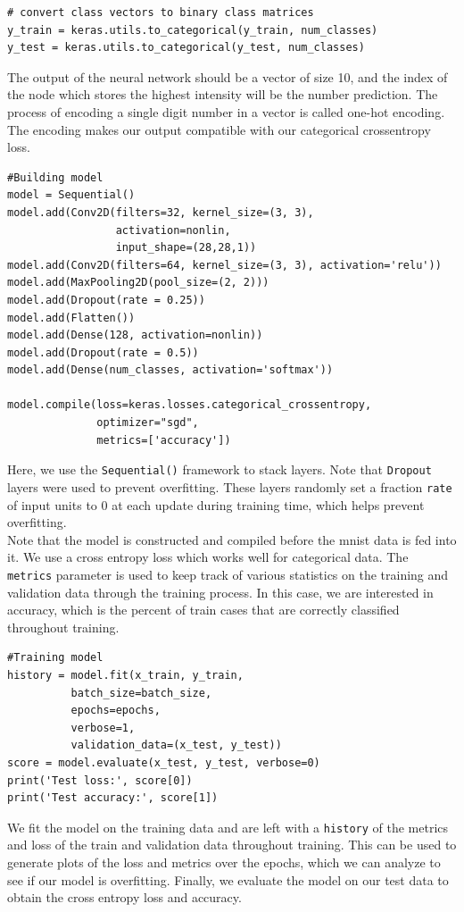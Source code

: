 \documentclass[11pt]{article}
\begin{document}
 \begin{lstlisting}
# convert class vectors to binary class matrices
y_train = keras.utils.to_categorical(y_train, num_classes)
y_test = keras.utils.to_categorical(y_test, num_classes)
\end{lstlisting}
The output of the neural network should be a vector of size 10, and the index of the node which stores the highest intensity will be the number prediction. The process of encoding a single digit number in a vector is called one-hot encoding. The encoding makes our output compatible with our categorical crossentropy loss.
\begin{lstlisting}
#Building model
model = Sequential()
model.add(Conv2D(filters=32, kernel_size=(3, 3),
                 activation=nonlin,
                 input_shape=(28,28,1))
model.add(Conv2D(filters=64, kernel_size=(3, 3), activation='relu'))
model.add(MaxPooling2D(pool_size=(2, 2)))
model.add(Dropout(rate = 0.25))
model.add(Flatten())
model.add(Dense(128, activation=nonlin))
model.add(Dropout(rate = 0.5))
model.add(Dense(num_classes, activation='softmax'))

model.compile(loss=keras.losses.categorical_crossentropy,
              optimizer="sgd",
              metrics=['accuracy'])
\end{lstlisting}

Here, we use the \texttt{Sequential()} framework to stack layers. Note that \texttt{Dropout} layers were used to prevent overfitting. These layers randomly set a fraction \texttt{rate} of input units to 0 at each update during training time, which helps prevent overfitting.  \\
Note that the model is constructed and compiled before the mnist data is fed into it. We use a cross entropy loss which works well for categorical data. The \texttt{metrics} parameter is used to keep track of various statistics on the training and validation data through the training process. In this case, we are interested in accuracy, which is the percent of train cases that are correctly classified throughout training. 

\begin{lstlisting}
#Training model
history = model.fit(x_train, y_train,
          batch_size=batch_size,
          epochs=epochs,
          verbose=1,
          validation_data=(x_test, y_test))
score = model.evaluate(x_test, y_test, verbose=0)
print('Test loss:', score[0])
print('Test accuracy:', score[1])
\end{lstlisting}
We fit the model on the training data and are left with a \texttt{history} of the metrics and loss of the train and validation data throughout training. This can be used to generate plots of the loss and metrics over the epochs, which we can analyze to see if our model is overfitting. Finally, we evaluate the model on our test data to obtain the cross entropy loss and accuracy.
\end{document}
